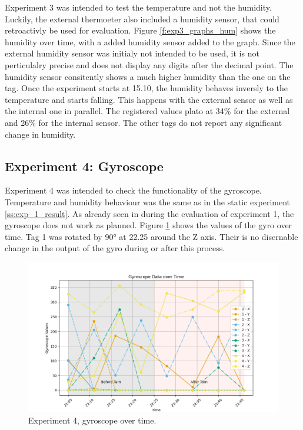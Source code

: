 Experiment 3 was intended to test the temperature and not the humidity.
Luckily, the external thermoeter also included a humidity sensor, that could retroactivly be used for evaluation.
Figure \ref{f:exp3_graphs_hum} shows the humidity over time, with a added humidity sensor added to the graph.
Since the external humidity sensor was initialy not intended to be used, it is not perticulalry precise and does not display any digits after the decimal point.
The humidity sensor consitently shows a much higher humidity than the one on the tag.
Once the experiment starts at 15.10, the humidity behaves inversly to the temperature and starts falling.
This happens with the external sensor as well as the internal one in parallel.
The registered values plato at 34\% for the external and 26\% for the internal sensor.
The other tags do not report any significant change in humidity.

\subsection{Experiment 4: Gyroscope}
\label{ss:exp_4_result}

Experiment 4 was intended to check the functionality of the gyroscope.
Temperature and humidity behaviour was the same as in the static experiment \ref{ss:exp_1_result}.
As already seen in during the evaluation of experiment 1, the gyroscope does not work as planned.
Figure \ref{f:exp4_graphs_gyro} shows the values of the gyro over time.
Tag 1 was rotated by 90° at 22.25 around the Z axis.
Their is no disernable change in the output of the gyro during or after this process.

\begin{figure}[ht!]
\includegraphics[width=\linewidth]{graphics/exp/exp4_gyro_data_plot_1.png}
 \caption{Experiment 4, gyroscope over time.}
\label{f:exp4_graphs_gyro}
\end{figure}


